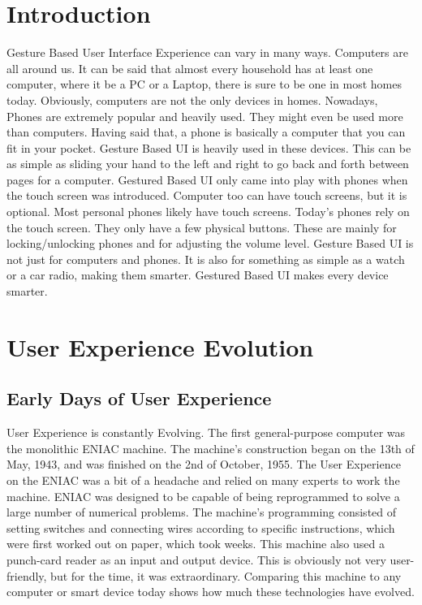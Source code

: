 \documentclass{article}
\begin{document}
\section{Introduction}
Gesture Based User Interface Experience can vary in many ways. Computers are all around us. It can be said that almost every household has at least one computer, where it be a PC or a Laptop, there is sure to be one in most homes today. Obviously, computers are not the only devices in homes. Nowadays, Phones are extremely popular and heavily used. They might even be used more than computers. Having said that, a phone is basically a computer that you can fit in your pocket. Gesture Based UI is heavily used in these devices. This can be as simple as sliding your hand to the left and right to go back and forth between pages for a computer. Gestured Based UI only came into play with phones when the touch screen was introduced. Computer too can have touch screens, but it is optional. Most personal phones likely have touch screens. Today's phones rely on the touch screen. They only have a few physical buttons. These are mainly for locking/unlocking phones and for adjusting the volume level. Gesture Based UI is not just for computers and phones. It is also for something as simple as a watch or a car radio, making them smarter. Gestured Based UI makes every device smarter.

\section{User Experience Evolution}
\subsection{Early Days of User Experience}
User Experience is constantly Evolving. The first general-purpose computer was the monolithic ENIAC machine. The machine's construction began on the 13th of May, 1943, and was finished on the 2nd of October, 1955. The User Experience on the ENIAC was a bit of a headache and relied on many experts to work the machine. ENIAC was designed to be capable of being reprogrammed to solve a large number of numerical problems. The machine's programming consisted of setting switches and connecting wires according to specific instructions, which were first worked out on paper, which took weeks. This machine also used a punch-card reader as an input and output device. This is obviously not very user-friendly, but for the time, it was extraordinary. Comparing this machine to any computer or smart device today shows how much these technologies have evolved.
\cite{ref1}
\end{document}
